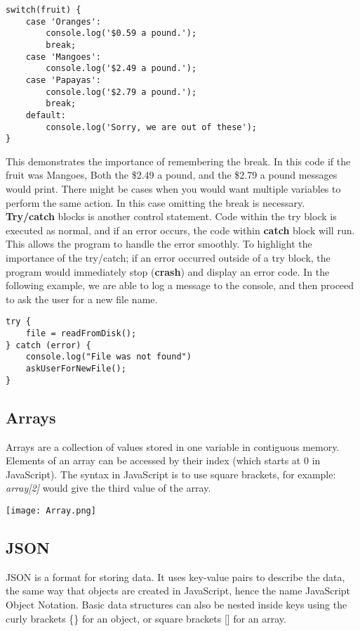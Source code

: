 \documentclass[portfolio.tex]{subfiles}
\begin{document}
				\begin{lstlisting}
switch(fruit) {
	case 'Oranges':
		console.log('$0.59 a pound.');
		break;
	case 'Mangoes':
		console.log('$2.49 a pound.');
	case 'Papayas':
		console.log('$2.79 a pound.');
		break;
	default:
		console.log('Sorry, we are out of these');
}
				\end{lstlisting}

				\vspace{0.5cm}

				This demonstrates the importance of remembering the break. In this code if the fruit was Mangoes, Both the \$2.49 a pound, and the \$2.79 a pound messages would print. There might be cases when you would want multiple variables to perform the same action. In this case omitting the break is necessary. \\

				\textbf{Try/catch} blocks is another control statement. Code within the try block is executed as normal, and if an error occurs, the code within \textbf{catch} block will run. This allows the program to handle the error smoothly. To highlight the importance of the try/catch; if an error occurred outside of a try block, the program would immediately stop (\textbf{crash}) and display an error code. In the following example, we are able to log a message to the console, and then proceed to ask the user for a new file name. \\

				\begin{lstlisting}
try {
	file = readFromDisk();
} catch (error) {
	console.log("File was not found")
	askUserForNewFile();
}
				\end{lstlisting}

			\subsection{Arrays}
				Arrays are a collection of values stored in one variable in contiguous memory. Elements of an array can be accessed by their index (which starts at 0 in JavaScript). The syntax in JavaScript is to use square brackets, for example: \textit{array[2]} would give the third value  of the array. \\

				\begin{center}
					\texttt{[image: Array.png]}
				\end{center}

			\subsection{JSON}
				JSON is a format for storing data. It uses key-value pairs to describe the data, the same way that objects are created in JavaScript, hence the name JavaScript Object Notation. Basic data structures can also be nested inside keys using the curly brackets \{\} for an object, or square brackets [] for an array. \\
\end{document}
